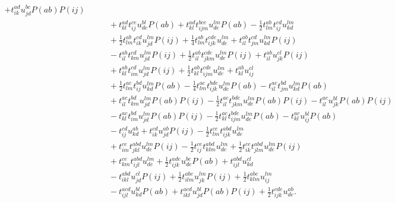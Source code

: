 \begin{align}
            + t^{ad}_{ik} u^{bc}_{jd} P(ab) P(ij)
            \nonumber \\
            &\qquad
            + t^{ad}_{kl} t^{ce}_{ij} u^{bl}_{de} P(ab)
            + t^{ad}_{kl} t^{bce}_{ijm} u^{lm}_{de} P(ab)
            - \frac{1}{2} t^{ab}_{lm} t^{cd}_{ij} u^{lm}_{kd}
            \nonumber \\
            &\qquad
            + \frac{1}{2} t^{ab}_{lm} t^{cd}_{ik} u^{lm}_{jd} P(ij)
            + \frac{1}{4} t^{ab}_{lm} t^{cde}_{ijk} u^{lm}_{de}
            + t^{ab}_{il} t^{cd}_{jm} u^{lm}_{kd} P(ij)
            \nonumber \\
            &\qquad
            - t^{ab}_{il} t^{cd}_{km} u^{lm}_{jd} P(ij)
            + \frac{1}{2} t^{ab}_{il} t^{cde}_{jkm} u^{lm}_{de} P(ij)
            + t^{ab}_{il} u^{cl}_{jk} P(ij)
            \nonumber \\
            &\qquad
            + t^{ab}_{kl} t^{cd}_{im} u^{lm}_{jd} P(ij)
            + \frac{1}{2} t^{ab}_{kl} t^{cde}_{ijm} u^{lm}_{de}
            + t^{ab}_{kl} u^{cl}_{ij}
            \nonumber \\
            &\qquad
            + \frac{1}{2} t^{ac}_{lm} t^{bd}_{ij} u^{lm}_{kd} P(ab)
            - \frac{1}{4} t^{ac}_{lm} t^{bde}_{ijk} u^{lm}_{de} P(ab)
            - t^{ac}_{il} t^{bd}_{jm} u^{lm}_{kd} P(ab)
            \nonumber \\
            &\qquad
            + t^{ac}_{il} t^{bd}_{km} u^{lm}_{jd} P(ab) P(ij)
            - \frac{1}{2} t^{ac}_{il} t^{bde}_{jkm} u^{lm}_{de} P(ab) P(ij)
            - t^{ac}_{il} u^{bl}_{jk} P(ab) P(ij)
            \nonumber \\
            &\qquad
            - t^{ac}_{kl} t^{bd}_{im} u^{lm}_{jd} P(ab) P(ij)
            - \frac{1}{2} t^{ac}_{kl} t^{bde}_{ijm} u^{lm}_{de} P(ab)
            - t^{ac}_{kl} u^{bl}_{ij} P(ab)
            \nonumber \\
            &\qquad
            - t^{cd}_{ij} u^{ab}_{kd}
            + t^{cd}_{ik} u^{ab}_{jd} P(ij)
            - \frac{1}{2} t^{ce}_{lm} t^{abd}_{ijk} u^{lm}_{de}
            \nonumber \\
            &\qquad
            + t^{ce}_{im} t^{abd}_{jkl} u^{lm}_{de} P(ij)
            - \frac{1}{2} t^{ce}_{ij} t^{abd}_{klm} u^{lm}_{de}
            + \frac{1}{2} t^{ce}_{ik} t^{abd}_{jlm} u^{lm}_{de} P(ij)
            \nonumber \\
            &\qquad
            + t^{ce}_{km} t^{abd}_{ijl} u^{lm}_{de}
            + \frac{1}{2} t^{ade}_{ijk} u^{bc}_{de} P(ab)
            + t^{abd}_{ijl} u^{cl}_{kd}
            \nonumber \\
            &\qquad
            - t^{abd}_{ikl} u^{cl}_{jd} P(ij)
            + \frac{1}{2} t^{abc}_{ilm} u^{lm}_{jk} P(ij)
            + \frac{1}{2} t^{abc}_{klm} u^{lm}_{ij}
            \nonumber \\
            &\qquad
            - t^{acd}_{ijl} u^{bl}_{kd} P(ab)
            + t^{acd}_{ikl} u^{bl}_{jd} P(ab) P(ij)
            + \frac{1}{2} t^{cde}_{ijk} u^{ab}_{de}.
        \end{align}
